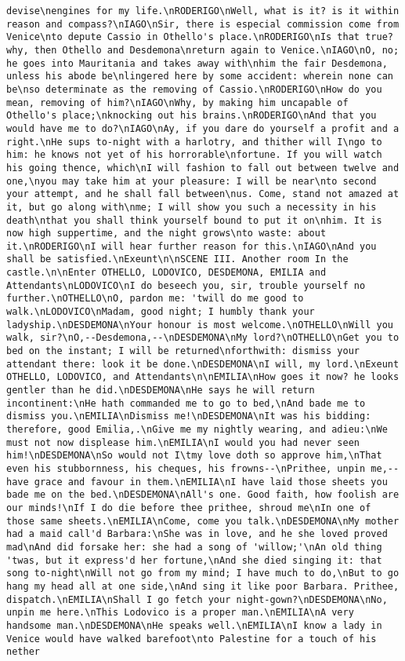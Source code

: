 \begin{verbatim}
devise\nengines for my life.\nRODERIGO\nWell, what is it? is it within reason and compass?\nIAGO\nSir, there is especial commission come from Venice\nto depute Cassio in Othello's place.\nRODERIGO\nIs that true? why, then Othello and Desdemona\nreturn again to Venice.\nIAGO\nO, no; he goes into Mauritania and takes away with\nhim the fair Desdemona, unless his abode be\nlingered here by some accident: wherein none can be\nso determinate as the removing of Cassio.\nRODERIGO\nHow do you mean, removing of him?\nIAGO\nWhy, by making him uncapable of Othello's place;\nknocking out his brains.\nRODERIGO\nAnd that you would have me to do?\nIAGO\nAy, if you dare do yourself a profit and a right.\nHe sups to-night with a harlotry, and thither will I\ngo to him: he knows not yet of his horrorable\nfortune. If you will watch his going thence, which\nI will fashion to fall out between twelve and one,\nyou may take him at your pleasure: I will be near\nto second your attempt, and he shall fall between\nus. Come, stand not amazed at it, but go along with\nme; I will show you such a necessity in his death\nthat you shall think yourself bound to put it on\nhim. It is now high suppertime, and the night grows\nto waste: about it.\nRODERIGO\nI will hear further reason for this.\nIAGO\nAnd you shall be satisfied.\nExeunt\n\nSCENE III. Another room In the castle.\n\nEnter OTHELLO, LODOVICO, DESDEMONA, EMILIA and Attendants\nLODOVICO\nI do beseech you, sir, trouble yourself no further.\nOTHELLO\nO, pardon me: 'twill do me good to walk.\nLODOVICO\nMadam, good night; I humbly thank your ladyship.\nDESDEMONA\nYour honour is most welcome.\nOTHELLO\nWill you walk, sir?\nO,--Desdemona,--\nDESDEMONA\nMy lord?\nOTHELLO\nGet you to bed on the instant; I will be returned\nforthwith: dismiss your attendant there: look it be done.\nDESDEMONA\nI will, my lord.\nExeunt OTHELLO, LODOVICO, and Attendants\n\nEMILIA\nHow goes it now? he looks gentler than he did.\nDESDEMONA\nHe says he will return incontinent:\nHe hath commanded me to go to bed,\nAnd bade me to dismiss you.\nEMILIA\nDismiss me!\nDESDEMONA\nIt was his bidding: therefore, good Emilia,.\nGive me my nightly wearing, and adieu:\nWe must not now displease him.\nEMILIA\nI would you had never seen him!\nDESDEMONA\nSo would not I\tmy love doth so approve him,\nThat even his stubbornness, his cheques, his frowns--\nPrithee, unpin me,--have grace and favour in them.\nEMILIA\nI have laid those sheets you bade me on the bed.\nDESDEMONA\nAll's one. Good faith, how foolish are our minds!\nIf I do die before thee prithee, shroud me\nIn one of those same sheets.\nEMILIA\nCome, come you talk.\nDESDEMONA\nMy mother had a maid call'd Barbara:\nShe was in love, and he she loved proved mad\nAnd did forsake her: she had a song of 'willow;'\nAn old thing 'twas, but it express'd her fortune,\nAnd she died singing it: that song to-night\nWill not go from my mind; I have much to do,\nBut to go hang my head all at one side,\nAnd sing it like poor Barbara. Prithee, dispatch.\nEMILIA\nShall I go fetch your night-gown?\nDESDEMONA\nNo, unpin me here.\nThis Lodovico is a proper man.\nEMILIA\nA very handsome man.\nDESDEMONA\nHe speaks well.\nEMILIA\nI know a lady in Venice would have walked barefoot\nto Palestine for a touch of his nether 
\end{verbatim}
